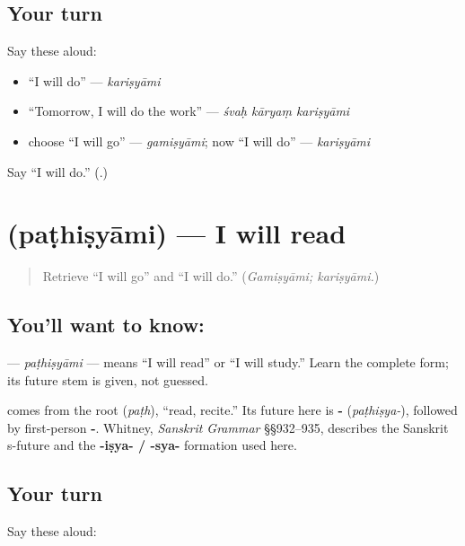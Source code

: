 \subsection*{Your turn}
Say these aloud:

\begin{itemize}
\raggedright
  \item “I will do” — \emph{kariṣyāmi}
  \item “Tomorrow, I will do the work” — \emph{śvaḥ kāryaṃ kariṣyāmi}
  \item choose “I will go” — \emph{gamiṣyāmi}; now “I will do” — \emph{kariṣyāmi}
\end{itemize}

\begin{tcolorbox}[breakable,colback=teal!4,colframe=teal!35!black,title={Before you move on}]
Say “I will do.” (\textbf{}.)
\end{tcolorbox}
\section[\texorpdfstring{\sk{पठिष्यामि} (paṭhiṣyāmi)}{पठिष्यामि (paṭhiṣyāmi)}]{ (paṭhiṣyāmi) — I will read}

\label{lesson:SA-C264-pathisyami}



\begin{quote}
Retrieve “I will go” and “I will do.” (\emph{Gamiṣyāmi; kariṣyāmi.})
\end{quote}

\subsection*{You'll want to know: }
\textbf{} — \emph{paṭhiṣyāmi} — means “I will read” or “I will study.” Learn the complete form; its future stem is given, not guessed.

\begin{cousinweb}
\textbf{} comes from the root \textbf{} (\emph{paṭh}), “read, recite.” Its future here is \textbf{-} (\emph{paṭhiṣya-}), followed by first-person \textbf{-}. Whitney, \emph{Sanskrit Grammar} §§932–935, describes the Sanskrit s-future and the \textbf{-iṣya- / -sya-} formation used here.
\end{cousinweb}

\subsection*{Your turn}
Say these aloud:

